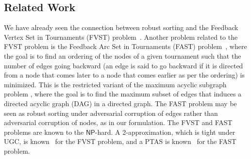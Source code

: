 \documentclass[11pt]{llncs}
\begin{document}
\subsection{Related Work}
We have already seen the connection between robust sorting and the Feedback Vertex Set in Tournaments (FVST) problem~\cite{fvst,mnich16}. Another problem related to the FVST problem is the Feedback Arc Set in Tournaments (FAST) problem~\cite{acn08,ms07}, where the goal is to find an ordering of the nodes of a given tournament such that the number of edges going backward (an edge is said to go backward if it is directed from a node that comes later to a node that comes earlier as per the ordering) is minimized. This is the restricted variant of the maximum acyclic subgraph problem \cite{fk99}, where the goal is to find the maximum subset of edges that induces a directed acyclic graph (DAG) in a directed graph. The FAST problem may be seen as robust sorting under adversarial corruption of edges rather than adversarial corruption of nodes, as in our formulation. The FVST and FAST problems are known to the $\mathsf{NP}$-hard. A 2-approximation, which is tight under UGC, is known~\cite{fvst} for the FVST problem, and a PTAS is known~\cite{ms07} for the FAST problem. 
\end{document}
